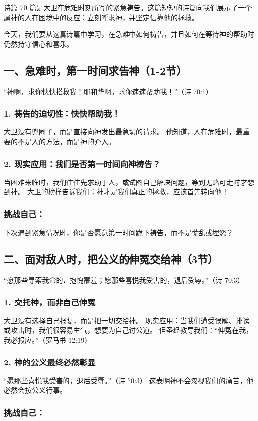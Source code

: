 \documentclass[a4paper, 12pt]{article}
\begin{document}
诗篇 70 篇是大卫在危难时刻所写的紧急祷告。这篇短短的诗篇向我们展示了一个属神的人在困境中的反应：立刻呼求神，并坚定信靠他的拯救。

今天，我们要从这篇诗篇中学习，在急难中如何祷告，并且如何在等待神的帮助时仍然持守信心和喜乐。

\subsection*{一、急难时，第一时间求告神（1-2节）}
“神啊，求你快快搭救我！耶和华啊，求你速速帮助我！”（诗 70:1）

\subsubsection*{1. 祷告的迫切性：快快帮助我！}
大卫没有兜圈子，而是直接向神发出最急切的请求。
他知道，人在危难时，最重要的不是人的方法，而是神的介入。
\subsubsection*{2. 现实应用：我们是否第一时间向神祷告？}
当困难来临时，我们往往先求助于人，或试图自己解决问题，等到无路可走时才想到神。
大卫的榜样告诉我们：神才是我们真正的拯救，应该首先转向他！
\subsubsection*{挑战自己：}

下次遇到紧急情况时，你是否愿意第一时间跪下祷告，而不是慌乱或埋怨？
\subsection*{二、面对敌人时，把公义的伸冤交给神（3节）}
“愿那些寻索我命的，抱愧蒙羞；愿那些喜悦我受害的，退后受辱。”（诗 70:3）

\subsubsection*{1. 交托神，而非自己伸冤}
大卫没有选择自己报复，而是把一切交给神。
现实应用：当我们遭受误解、诽谤或攻击时，我们很容易生气，想要为自己讨公道。
但圣经教导我们：“伸冤在我，我必报应。”（罗马书 12:19）
\subsubsection*{2. 神的公义最终必然彰显}
“愿那些喜悦我受害的，退后受辱。”（诗 70:3）
这表明神不会忽视我们的痛苦，他必然会按公义行事。
\subsubsection*{挑战自己：}
\end{document}
